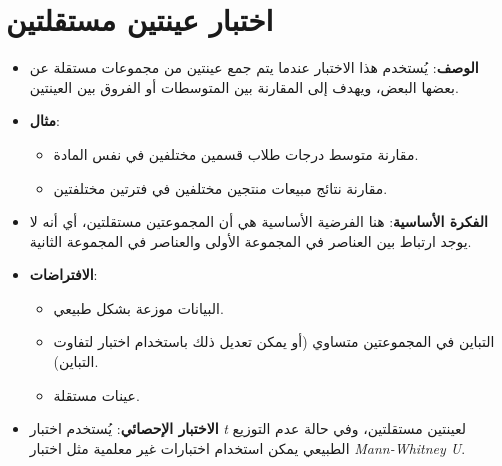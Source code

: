 	\section{اختبار عينتين مستقلتين }
	\begin{itemize}
		\item \textbf{الوصف}: يُستخدم هذا الاختبار عندما يتم جمع عينتين من مجموعات مستقلة عن بعضها البعض، ويهدف إلى المقارنة بين المتوسطات أو الفروق بين العينتين.
		\item \textbf{مثال}: 
		\begin{itemize}
			\item مقارنة متوسط درجات طلاب قسمين مختلفين في نفس المادة.
			\item مقارنة نتائج مبيعات منتجين مختلفين في فترتين مختلفتين.
		\end{itemize}
		\item \textbf{الفكرة الأساسية}: هنا الفرضية الأساسية هي أن المجموعتين مستقلتين، أي أنه لا يوجد ارتباط بين العناصر في المجموعة الأولى والعناصر في المجموعة الثانية.
		\item \textbf{الافتراضات}:
		\begin{itemize}
			\item البيانات موزعة بشكل طبيعي.
			\item التباين في المجموعتين متساوي (أو يمكن تعديل ذلك باستخدام اختبار لتفاوت التباين).
			\item عينات مستقلة.
		\end{itemize}
		\item \textbf{الاختبار الإحصائي}: يُستخدم اختبار \textit{t} لعينتين مستقلتين، وفي حالة عدم التوزيع الطبيعي يمكن استخدام اختبارات غير معلمية مثل اختبار \textit{Mann-Whitney U}.
	\end{itemize}
	
